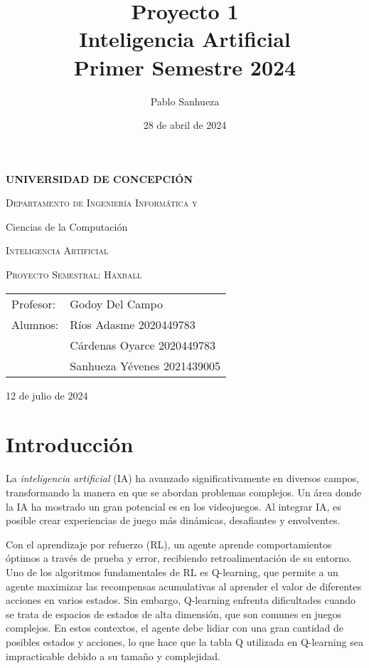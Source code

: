\documentclass[10pt]{article}
\title{Proyecto 1\\ {\Large Inteligencia Artificial}\\ {\Large Primer Semestre 2024}}
\date{}
\author{Pablo Sanhueza}
\date{28 de abril de 2024}
\begin{document}

\begin{titlepage}
	\centering
	\vspace{12pt}
	{\bfseries\large UNIVERSIDAD DE CONCEPCIÓN\par}
	{\scshape\large Departamento de Ingeniería Informática y\par Ciencias de la Computación\par}
	\vfill
	{\scshape\Large Inteligencia Artificial\par}
	\vspace{12pt}
	{\scshape\Large Proyecto Semestral: Haxball}
	\vfill
	\normalsize \begin{flushright}
		\begin{tabular}{@{}ll@{}}
			Profesor:
			&\@Julio Godoy Del Campo\\

			Alumnos:
			&\@Vicente Ríos Adasme \hfill 2020449783\\
			& Cárdenas Oyarce \hfill 2020449783\\
			&\@Pablo Sanhueza Yévenes \hfill 2021439005\\
		\end{tabular}
	\end{flushright}
	\vfill
	{\large 12 de julio de 2024 \par}
\end{titlepage}

\newpage
\section{Introducción}

La \textit{inteligencia artificial} (IA) ha avanzado significativamente en diversos campos, transformando la manera en que se abordan problemas complejos. Un área donde la IA ha mostrado un gran potencial es en los videojuegos. Al integrar IA, es posible crear experiencias de juego más dinámicas, desafiantes y envolventes.

Con el aprendizaje por refuerzo (RL), un agente aprende comportamientos óptimos a través de prueba y error, recibiendo retroalimentación de su entorno. Uno de los algoritmos fundamentales de RL es Q-learning, que permite a un agente maximizar las recompensas acumulativas al aprender el valor de diferentes acciones en varios estados. Sin embargo, Q-learning enfrenta dificultades cuando se trata de espacios de estados de alta dimensión, que son comunes en juegos complejos. En estos contextos, el agente debe lidiar con una gran cantidad de posibles estados y acciones, lo que hace que la tabla Q utilizada en Q-learning sea impracticable debido a su tamaño y complejidad.
\end{document}

